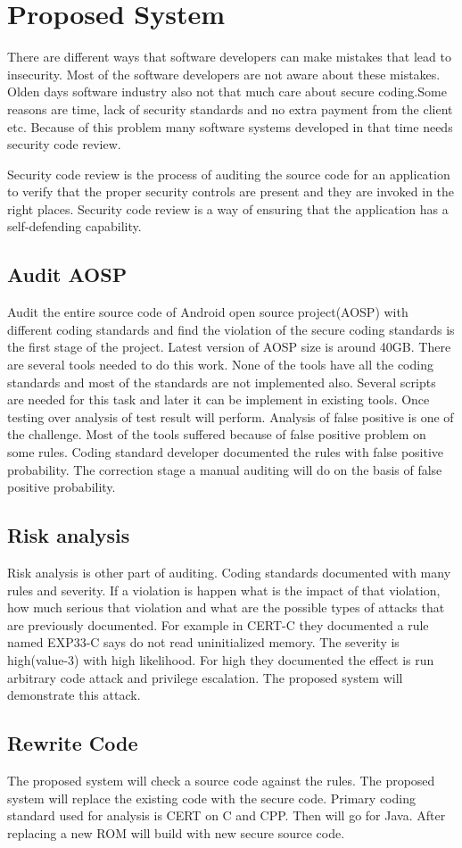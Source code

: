 \chapter{Proposed System}
There are different ways that software developers can make mistakes that lead to insecurity. Most of the software developers are not aware about these mistakes. Olden days software industry also not that much care about secure coding.Some reasons are time, lack of security standards and no extra payment from the client etc. Because of this problem many software systems developed in that time needs security code review.

Security code review is the process of auditing the source code for an application to verify that the proper security controls are present and they are invoked in the right places. Security code review is a way of ensuring that the application has a self-defending capability. 

 
	
	\section{Audit AOSP}
	Audit the entire source code of Android open source project(AOSP) with different coding standards and find the violation of the secure coding standards is the first stage of the project. Latest version of AOSP size is around 40GB. There are several tools needed to do this work. None of the tools have all the coding standards and most of the standards are not implemented also. Several scripts are needed for this task and later it can be implement in existing tools. Once testing over analysis of test result will perform. Analysis of false positive is one of the challenge. Most of the tools suffered because of false positive problem on some rules. Coding standard developer documented the rules with false positive probability. The correction stage a manual auditing will do on the basis of false positive probability. 
	\section{Risk analysis}
	Risk analysis is other part of auditing. Coding standards documented with many rules and severity. If a violation is happen what is the impact of that violation, how much serious that violation and what are the possible types of attacks that are previously documented. For example in CERT-C \cite{cert-c} they documented a rule named EXP33-C says do not read uninitialized memory. The severity is high(value-3) with high likelihood. For high they documented the effect is run arbitrary code attack and privilege escalation. The proposed system will demonstrate this attack. 
	 
	\section{Rewrite Code}
 
	The proposed system will check a source code against the rules. The proposed system will replace the existing code with the secure code. Primary coding standard used for analysis is CERT on C and CPP. Then will go for Java. After replacing a new ROM will build with new secure source code.
 

